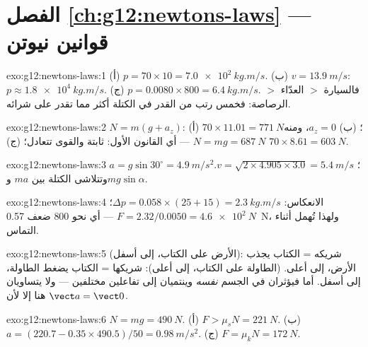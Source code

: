 \section*{الفصل \ref{ch:g12:newtons-laws} --- قوانين نيوتن}

\begin{solution}{exo:g12:newtons-laws:1}
(أ) $p = 70 \times 10 = \qty{7.0e2}{kg.m/s}$.
(ب) $v = \qty{13.9}{m/s}$: $p \approx \qty{1.8e4}{kg.m/s}$.
(ج) $p = 0.0080 \times 800 = \qty{6.4}{kg.m/s}$. فالسيارة $>$ العدّاء $>$
الرصاصة: فخمس رتب من القدر في الكتلة أكثر مما تقدر  على شرائه.
\end{solution}

\begin{solution}{exo:g12:newtons-laws:2}
$N = m(g + a_z)$: (أ) $70 \times 11.01 = \qty{771}{N}$؛
(ب) $a_z = 0$، ومنه $N = mg = \qty{687}{N}$ --- أي القانون الأول: 
ثابتة والقوى تتعادل؛ (ج) $70 \times 8.61 = \qty{603}{N}$.
\end{solution}

\begin{solution}{exo:g12:newtons-laws:3}
$a = g\sin 30^\circ = \qty{4.9}{m/s^2}$؛
$v = \sqrt{2 \times 4.905 \times 3.0} = \qty{5.4}{m/s}$. وتتلاشى الكتلة
بين $ma$ و$mg\sin\alpha$.
\end{solution}

\begin{solution}{exo:g12:newtons-laws:4}
الانعكاس: $\Delta p = 0.058 \times (25 + 15) = \qty{2.3}{kg.m/s}$؛
$F = 2.32/0.0050 = \qty{4.6e2}{N}$ --- أي نحو $800$ ضعف
 \qty{0.57}{N}، ولهذا تُهمل  أثناء التماس.
\end{solution}

\begin{solution}{exo:g12:newtons-laws:5}
 (الأرض على الكتاب، إلى أسفل): شريكه = الكتاب يجذب الأرض، إلى أعلى.
 (الطاولة على الكتاب، إلى أعلى): شريكها = الكتاب يضغط الطاولة،
إلى أسفل. أما   فيؤثران في الجسم \emph{نفسه} وينتميان إلى
تفاعلين مختلفين --- ولا يتساويان هنا إلا لأن $\vect a = \vect 0$.
\end{solution}

\begin{solution}{exo:g12:newtons-laws:6}
$N = mg = \qty{490}{N}$. (أ) $F > \mu_s N = \qty{221}{N}$.
(ب) $a = (220.7 - 0.35 \times 490.5)/50 = \qty{0.98}{m/s^2}$.
(ج) $F = \mu_k N = \qty{172}{N}$.
\end{solution}

